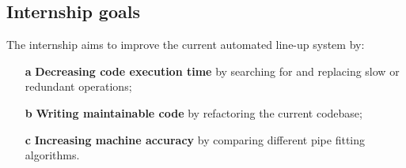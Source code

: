 \subsection{Internship goals} \label{ssec:intern_goals}
The internship aims to improve the current automated line-up system by:
\begin{enumerate}
      \item [\textbf{a}] \textbf{Decreasing code execution time} by searching for and replacing
      slow or redundant operations;
      \item [\textbf{b}] \textbf{Writing maintainable code} by refactoring the current codebase;
      \item [\textbf{c}] \textbf{Increasing machine accuracy} by comparing different pipe fitting algorithms.
\end{enumerate}
